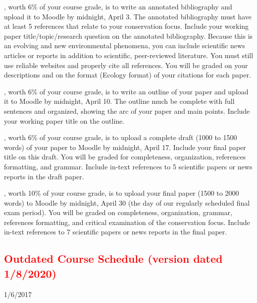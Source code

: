 \documentclass{tufte-handout}
\begin{document}
\begin{fullwidth}
, worth 6\% of your course grade, is to write an annotated bibliography and upload it to Moodle by midnight, April 3. The annotated bibliography must have at least 5 references that relate to your conservation focus. Include your working paper title/topic/research question on the annotated bibliography. Because this is an evolving and new environmental phenomena, you can include scientific news articles or reports in addition to scientific, peer-reviewed literature. You must still use reliable websites and properly cite all references. You will be graded on your descriptions and on the format (Ecology format) of your citations for each paper.

, worth 6\% of your course grade, is to write an outline of your paper and upload it to Moodle by midnight, April 10. The outline much be complete with full sentences and organized, showing the arc of your paper and main points. Include your working paper title on the outline.

, worth 6\% of your course grade, is to upload a complete draft (1000 to 1500 words) of your paper to Moodle by midnight, April 17. Include your final paper title on this draft. You will be graded for completeness, organization, references formatting, and grammar. Include in-text references to 5 scientific papers or news reports in the draft paper.

, worth 10\% of your course grade, is to upload your final paper (1500 to 2000 words) to Moodle by midnight, April 30 (the day of our regularly scheduled final exam period). You will be graded on completeness, organization, grammar,  references formatting, and critical examination of the conservation focus. Include in-text references to 7 scientific papers or news reports in the final paper.




\newpage
\subsection{\textcolor{red}{Outdated Course Schedule (version dated 1/8/2020)}}
%


  \setlength{\calwidth}{6.5in}
  \setlength{\calboxdepth}{0.3in}
  \begin{calendar}{1/6/20}{17}

 \skipday%
  \calday[Tuesday]{\classday} %
 \skipday%
  \calday[Thursday]{\classday} %
 \skipday%
    \skipday
    \skipday %



\end{calendar}
\end{fullwidth}
\end{document}
